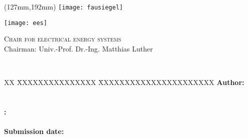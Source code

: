 \begin{titlepage}
	\thispagestyle{empty}

	\begin{textblock*}{\textwidth}(127mm,192mm)
	\texttt{[image: fausiegel]}
	\end{textblock*}

	\begin{minipage}[]{47mm}
		\texttt{[image: ees]}
	\end{minipage}
	\begin{minipage}[]{.7\textwidth}
		\raggedleft
		\textsc{Chair for electrical energy systems}\\
		Chairman: Univ.-Prof. Dr.-Ing. Matthias Luther
	\end{minipage}
	
	\vspace{51mm}
	
	{\centering
	
	\large{\arbeit} \\	
	\Large{\titel}
	
	\par}
	
	\vspace{105mm}
	
	{\raggedright
	\begin{tabbing}
	XX \= XXXXXXXXXXXXXXX \= XXXXXXXXXXXXXXXXXXXXXX \kill
			\> \textbf{Author:} 	\> \autor \\
			\>						\> \matrikelnr		\\
	 		\>												\>									\\
			\> \textbf{\langdbbetreuer:}		\> \betreuer \\
			\>												\>									\\
			\> \textbf{Submission date:}	\> \datumAbgabe															
	\end{tabbing}
	\par}
\end{titlepage}

